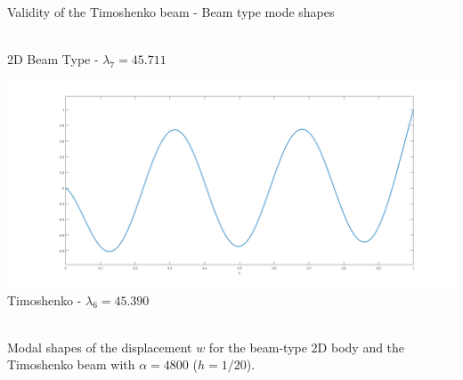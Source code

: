 \documentclass[8pt]{beamer}
\begin{document}
\begin{frame}{Validity of the Timoshenko beam - Beam type mode shapes}
\begin{minipage}[b]{0.45\textwidth}
                \\ 2D Beam Type - $\lambda_7 = 45.711$
                \label{fig:minipage4}
            \end{minipage}
            \hfill
            \begin{minipage}[b]{0.45\textwidth}
                \includegraphics[width=\textwidth]{1DBeam1.png}
                \\ Timoshenko - $\lambda_6 = 45.390$
                \label{fig:minipage3}
            \end{minipage}
            \\ Modal shapes of the displacement $w$ for the beam-type 2D body and the Timoshenko beam with $\alpha = 4800$ ($h = 1/20$).
        \end{frame}
        
\end{document}
